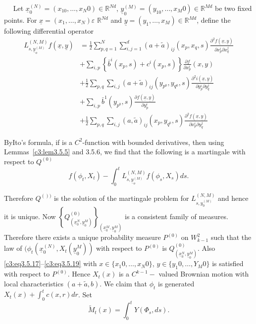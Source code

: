 \smallskip
{}~~
Let $\underline{x}^{(N)}_0 = (x_10, \ldots,
  x_N 0) \in \mathbb{R}^{Nd}$, $\underline{y}^{(M)}_0 =(y_10,
  \ldots,  x_M 0) \in \mathbb{R}^{Md}$ be two fixed
  points. For  $\underline{x} = (x_1, \ldots,  x_N ) \varepsilon$
  $\mathbb{R}^{Nd}$ and  $\underline{y} = (y_1, \ldots,  x_M )
  \in \mathbb{R}^{Md}$, define the following differential
  operator 
  \begin{align*}
    L^{(N,M)}_{s,\underline{y}_o^{(M)}} f(\underline{x},
    \underline{y}) & = \frac{1}{2} \sum^N_{p,q=1}\sum^d_{i,j=1} (a +
    \tilde{a})_{ij} (x_p,  x_q, s) \frac{\partial^2 f (\underline{x},
      \underline{y})}{\partial x^i_p \partial x^j_q} \\ 
    & + \sum_{i,p} \left\{ \bar{b}^i (x_p,  s) + c^i(x_p, s) \right\}
    \frac{\partial f}{\partial x^i_p} (x,y) \\ 
    & + \frac{1}{2} \sum_{p,q} \sum_{i,j} (a + \tilde{a})_{ij}
    (y_{p^0}, y_{q^0},s ) \frac{\partial^2 i (\underline{x},
      \underline{y})}{\partial y^i_p \partial y^j_q} \\ 
    & + \sum_{i,p} \bar{b}^1 (y_{p^0},s) \frac{\partial
      f(\underline{x}, \underline{y})}{\partial y^i_p} \\ 
    & +\frac{1}{2} \sum_{p,q} \sum_{i,j} (a,  \tilde{a})_{ij} (x_p,
    y_{q^0},s) \frac{\partial^2 f (\underline{x},
      \underline{y})}{\partial x^i_p \partial y^j_q} 
\tag{3.5.22}\label{c3:eq3.5.22}
\end{align*}

 By\pageoriginale Ito's formula, if is a $C^2$-function with bounded derivatives,
 then using Lemmas~\ref{c3:lem3.5.5} and 3.5.6, we find that 
the following is  a martingale with respect to $Q^{(0)}$ 
 \begin{equation*}
   f (\phi_t, X_t) - \int^t_0 L^{(N,M)}_{s,\underline{y}_o^{(M)}}
   f(\phi_s,  X_s) ds. \tag{3.5.23}\label{c3:eq3.5.23} 
 \end{equation*}

Therefore $Q^{())}$ is the solution of the martingale problem for\break
$L^{(N,M)}_{s,y^{(M)}_0}$ and hence it is unique. Now
$\left\{Q^{(0)}_{(\underline{x}_0^{N}, \underline{y}_0^{M})
}\right\}_{(\underline{x}_0^{M}, \underline{y}_0^{M})}$ is a consistent
  family of 
measures. Therefore there exists a unique probability measure $P^{(0)}$ on
$W^2_{k-1}$ such that the law of $(\phi_t (\underline{x}_0^{(N)}, X_t
(\underline{y}_0^{M}))$ with respect to $P^{(0)}$ is
$Q^{(0)}_{(\underline{x}_0^{N}, \underline{y}_0^{M})}$.  Also
\eqref{c3:eq3.5.17}--\eqref{c3:eq3.5.19} with $x \in \{ x_1 0, \ldots,  x_N 0
\}$,  $ y \in \{ y_1 0, \ldots, Y_M 0 \}$ is satisfied with
respect to $P^{(0)}$. Hence $X_t(x)$ is a $C^{k-1}-$ valued Brownian
motion with local characteristics $(a + \tilde{a}, b)$. We claim that
$\phi_t$ is generated $X_t (x) + \int^t_0 c(x,r)dr$. Set  
$$
\tilde{M}_t(x) =  \int^t_0 Y(\Phi_s, ds).
$$
 
